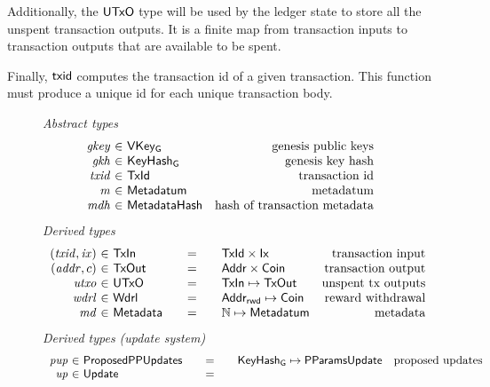 Additionally, the $\mathsf{UTxO}$ type will be used by the ledger state to store all the
unspent transaction outputs. It is a finite map from transaction inputs
to transaction outputs that are available to be spent.

Finally, $\mathsf{txid}$ computes the transaction id of a given transaction.
This function must produce a unique id for each unique transaction body.

\begin{figure*}[htb]
  \emph{Abstract types}
  \begin{equation*}
    \begin{array}{r@{~\in~}lr}
      \var{gkey} & \VKeyGen & \text{genesis public keys}\\
      \var{gkh} & \KeyHashGen & \text{genesis key hash}\\
      \var{txid} & \TxId & \text{transaction id}\\
      \var{m} & \Metadatum & \text{metadatum}\\
      \var{mdh} & \MetadataHash & \text{hash of transaction metadata}\\
    \end{array}
  \end{equation*}
  \emph{Derived types}
  \begin{equation*}
    \begin{array}{r@{~\in~}l@{\qquad=\qquad}lr}
      (\var{txid}, \var{ix})
      & \TxIn
      & \TxId \times \Ix
      & \text{transaction input}
      \\
      (\var{addr}, c)
      & \type{TxOut}
      & \Addr \times \Coin
      & \text{transaction output}
      \\
      \var{utxo}
      & \UTxO
      & \TxIn \mapsto \TxOut
      & \text{unspent tx outputs}
      \\
      \var{wdrl}
      & \Wdrl
      & \AddrRWD \mapsto \Coin
      & \text{reward withdrawal}
      \\
      \var{md}
      & \Metadata
      & \N \mapsto \Metadatum
      & \text{metadata}
    \end{array}
  \end{equation*}
  \emph{Derived types (update system)}
  \begin{equation*}
    \begin{array}{r@{~\in~}l@{\qquad=\qquad}lr}
      \var{pup}
      & \ProposedPPUpdates
      & \KeyHashGen \mapsto \PParamsUpdate
      & \text{proposed updates}
      \\
      \var{up}
      & \Update

\end{array}
\end{equation*}
\end{figure*}
